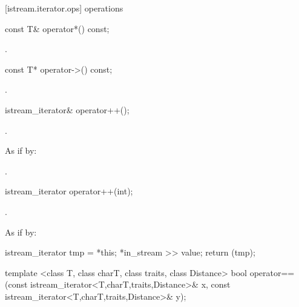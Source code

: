[istream.iterator.ops]{ operations}

%
\begin{itemdecl}
const T& operator*() const;
\end{itemdecl}

\begin{itemdescr}
\pnum
\returns
{}.
\end{itemdescr}

%
\begin{itemdecl}
const T* operator->() const;
\end{itemdecl}

\begin{itemdescr}
\pnum
\returns
{}.
\end{itemdescr}

%
\begin{itemdecl}
istream_iterator& operator++();
\end{itemdecl}

\begin{itemdescr}
\pnum
\requires {}.

\pnum
\effects
As if by: 

\pnum
\returns
{}.
\end{itemdescr}

%
\begin{itemdecl}
istream_iterator operator++(int);
\end{itemdecl}

\begin{itemdescr}
\pnum
\requires {}.

\pnum
\effects
As if by:
\begin{codeblock}
istream_iterator tmp = *this;
*in_stream >> value;
return (tmp);
\end{codeblock}
\end{itemdescr}

%
\begin{itemdecl}
template <class T, class charT, class traits, class Distance>
  bool operator==(const istream_iterator<T,charT,traits,Distance>& x,
                  const istream_iterator<T,charT,traits,Distance>& y);
\end{itemdecl}

